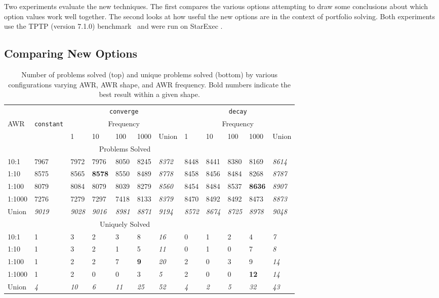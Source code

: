 \documentclass{llncs}
\begin{document}
Two experiments evaluate the new techniques.
The first compares the various options attempting to draw some conclusions about which option values work well together. The second looks at how useful the new options are in the context of portfolio solving. Both experiments use the TPTP (version 7.1.0) benchmark~\cite{tptp} and were run on StarExec \cite{starexec}.

\subsection{Comparing New Options}


\begin{table}[t]
\caption{
	Number of problems solved (top) and unique problems solved (bottom) by various configurations varying AWR, AWR shape, and AWR frequency.
	Bold numbers indicate the best result within a given shape.
}
\label{tab:short:runs}
\centering
\begin{tabular}{l|l|lllll|lllll}
	& & \multicolumn{5}{|c}{\texttt{converge}} & \multicolumn{5}{|c}{\texttt{decay}}\\  
AWR & \texttt{constant} & \multicolumn{5}{|c|}{Frequency} & \multicolumn{5}{|c}{Frequency}\\  
&& 1 & 10 & 100 & 1000 & Union & 1 & 10 & 100 & 1000 & Union\\
\hline
\multicolumn{10}{c}{Problems Solved} \\ \hline
10:1		& 7967 & 7972 & 7976 & 8050 & 8245 & \emph{8372} & 8448 & 8441 & 8380 & 8169 & \emph{8614}\\
1:10		& 8575 & 8565 & \textbf{8578} & 8550 & 8489 & \emph{8778} & 8458 & 8456 & 8484 & 8268 & \emph{8787}\\
1:100	        & 8079 & 8084 & 8079 & 8039 & 8279 & \emph{8560} & 8454 & 8484 & 8537 & \textbf{8636} & \emph{8907}\\
1:1000     	& 7276 & 7279 & 7297 & 7418 & 8133 & \emph{8379} & 8470 & 8492 & 8492 & 8473 & \emph{8873}\\
\hline
Union           & \emph{9019} & \emph{9028} & \emph{9016} & \emph{8981} & \emph{8871} & \emph{9194} & \emph{8572} & \emph{8674} & \emph{8725} & \emph{8978} & \emph{9048}\\
\hline
\hline
\multicolumn{10}{c}{Uniquely Solved} \\ \hline
10:1		& 1 & 3 & 2 & 3 & 8 & \emph{16} & 0 & 1 & 2 & 4 & \emph{7}\\
1:10		& 1 & 3 & 2 & 1 & 5 & \emph{11} & 0 & 1 & 0 & 7 & \emph{8}\\
1:100	        & 1 & 2 & 2 & 7 & \textbf{9} & \emph{20} & 2 & 0 & 3 & 9 & \emph{14}\\
1:1000	        & 1 & 2 & 0 & 0 & 3 & \emph{5} & 2 & 0 & 0 & \textbf{12} & \emph{14}\\
\hline
Union           & \emph{4} & \emph{10} & \emph{6} & \emph{11} & \emph{25} & \emph{52} & \emph{4} & \emph{2} & \emph{5} & \emph{32} & \emph{43}\\ 
\end{tabular}
\end{table}
\end{document}
